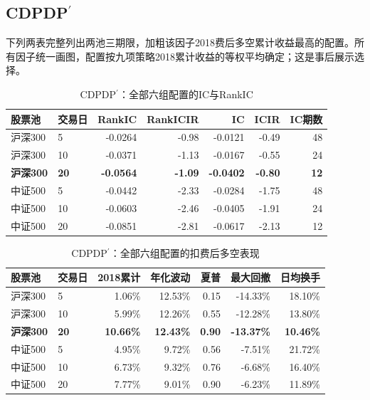 \subsection{CDPDP$^{\prime}$}
下列两表完整列出两池三期限，加粗该因子2018费后多空累计收益最高的配置。所有因子统一画图，配置按九项策略2018累计收益的等权平均确定；这是事后展示选择。
\begin{table}[H]\centering\normalsize\setlength{\tabcolsep}{3.5pt}
\caption{CDPDP$^{\prime}$：全部六组配置的IC与RankIC}\begin{tabular}{llrrrrr}\toprule
股票池 & 交易日 & RankIC & RankICIR & IC & ICIR & IC期数\\\midrule
沪深300 & 5 & -0.0264 & -0.98 & -0.0121 & -0.49 & 48 \\
沪深300 & 10 & -0.0371 & -1.13 & -0.0167 & -0.55 & 24 \\
\textbf{沪深300} & \textbf{20} & \textbf{-0.0564} & \textbf{-1.09} & \textbf{-0.0402} & \textbf{-0.80} & \textbf{12} \\
中证500 & 5 & -0.0442 & -2.33 & -0.0284 & -1.75 & 48 \\
中证500 & 10 & -0.0603 & -2.46 & -0.0405 & -1.91 & 24 \\
中证500 & 20 & -0.0851 & -2.81 & -0.0617 & -2.13 & 12 \\
\bottomrule\end{tabular}\end{table}
\begin{table}[H]\centering\normalsize\setlength{\tabcolsep}{3.5pt}
\caption{CDPDP$^{\prime}$：全部六组配置的扣费后多空表现}\begin{tabular}{llrrrrr}\toprule
股票池 & 交易日 & 2018累计 & 年化波动 & 夏普 & 最大回撤 & 日均换手\\\midrule
沪深300 & 5 & 1.06\% & 12.53\% & 0.15 & -14.33\% & 18.10\% \\
沪深300 & 10 & 5.99\% & 12.26\% & 0.55 & -12.28\% & 13.80\% \\
\textbf{沪深300} & \textbf{20} & \textbf{10.66\%} & \textbf{12.43\%} & \textbf{0.90} & \textbf{-13.37\%} & \textbf{10.46\%} \\
中证500 & 5 & 4.95\% & 9.72\% & 0.56 & -7.51\% & 21.72\% \\
中证500 & 10 & 6.73\% & 9.32\% & 0.76 & -6.68\% & 16.40\% \\
中证500 & 20 & 7.77\% & 9.01\% & 0.90 & -6.23\% & 11.89\% \\
\bottomrule\end{tabular}\end{table}
\clearpage
{}
\clearpage
